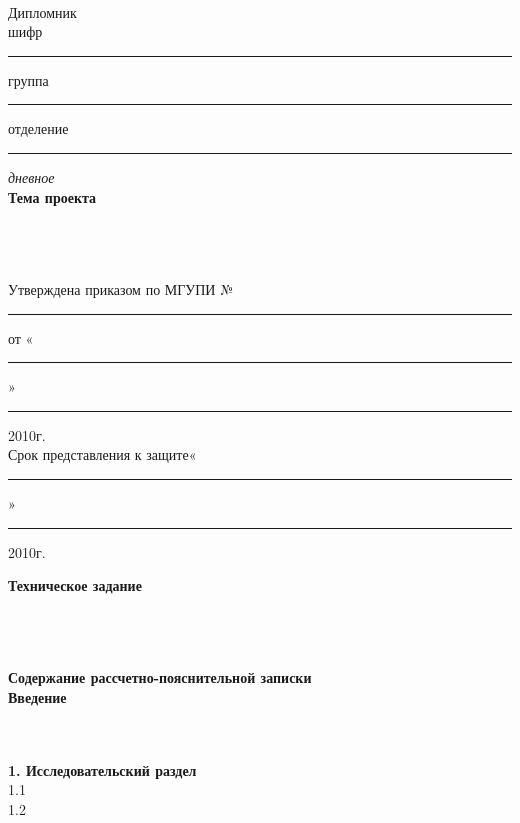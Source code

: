\begin{titlepage}
\newpage


\begin{center}
\vspace{0.5cm}
 \\
\end{center}

\begin{flushleft}
Дипломник
\hrulefill \\
шифр\rule{5cm}{0.5pt} группа\rule{3cm}{0.5pt} отделение\rule{1cm}{0.5pt}\textit{дневное}\hrulefill \\

\textbf{Тема проекта}\hrulefill \\
\hrulefill \\
\hrulefill \\
\hrulefill \\
\end{flushleft}

\begin{flushleft}
Утверждена приказом по МГУПИ №\rule{2cm}{0.5pt} от «\rule{2cm}{0.5pt}»\rule{2.65cm}{0.5pt}2010г. \\
Срок представления к защите«\rule{2cm}{0.5pt}»\rule{7cm}{0.5pt}2010г. \\
\end{flushleft}

\begin{flushleft}
\textbf{Техническое задание}
\fontsize{8pt}{4.05pt}{\selectfont{(цель и постановка задачи, исходные данные для проектирования)} } \\
\hrulefill \\
\hrulefill \\
\hrulefill \\
\end{flushleft}

\begin{flushleft}
\textbf{Содержание рассчетно-пояснительной записки} \\
\textbf{Введение}
\fontsize{8pt}{8.05pt}{\selectfont{(обоснование актуальности темы)} }\hrulefill \\
\hrulefill \\
\hrulefill \\
\end{flushleft}

\begin{flushleft}
\textbf{1. Исследовательский раздел}
\fontsize{8pt}{1pt}{\selectfont{(материал по исследованию предметной области, предмета проектирования,
анализ вариантов решения задач, выбор конкретного варианта)} } \\
1.1\hrulefill \\
1.2\hrulefill \\
\end{flushleft}


\end{titlepage}
